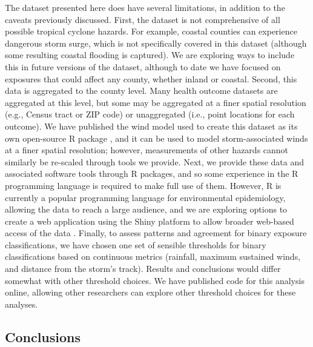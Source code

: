 The dataset presented here does have several limitations, in addition to the
caveats previously discussed. First, the dataset is not comprehensive of all
possible tropical cyclone hazards. For example, coastal counties can experience
dangerous storm surge, which is not specifically covered in this dataset
(although some resulting coastal flooding is captured). We are exploring ways
to include this in future versions of the dataset, although to date we have
focused on exposures that could affect any county, whether inland or coastal.
Second, this data is aggregated to the county level. Many health outcome
datasets are aggregated at this level, but some may be aggregated at a finer
spatial resolution (e.g., Census tract or ZIP code) or unaggregated (i.e.,
point locations for each outcome). We have published the wind model used to
create this dataset as its own open-source R package
\parencite{stormwindmodel}, and it can be used to model storm-associated winds
at a finer spatial resolution; however, measurements of other hazards cannot
similarly be re-scaled through tools we provide. Next, we provide these data
and associated software tools through R packages, and so some experience in the
R programming language is required to make full use of them. However, R is
currently a popular programming language for environmental epidemiology,
allowing the data to reach a large audience, and we are exploring options to
create a web application using the Shiny platform to allow broader web-based
access of the data \parencite{shiny2019}.  Finally, to assess patterns and
agreement for binary exposure classifications, we have chosen one set of
sensible thresholds for binary classifications based on continuous metrics
(rainfall, maximum sustained winds, and distance from the storm's track).
Results and conclusions would differ somewhat with other threshold choices. We
have published code for this analysis online, allowing
other researchers can explore other threshold choices for these
analyses.

\subsection*{Conclusions}

